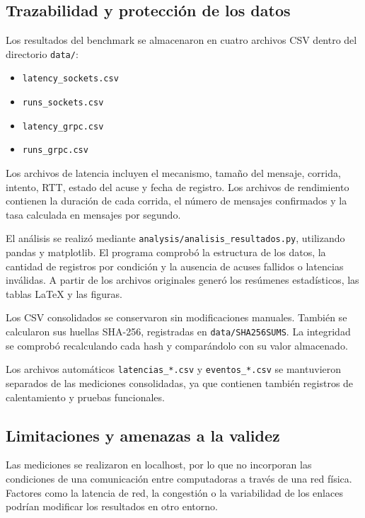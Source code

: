 \subsection{Trazabilidad y protección de los datos}

Los resultados del benchmark se almacenaron en cuatro archivos CSV
dentro del directorio \texttt{data/}:

\begin{itemize}
    \item \texttt{latency\_sockets.csv}
    \item \texttt{runs\_sockets.csv}
    \item \texttt{latency\_grpc.csv}
    \item \texttt{runs\_grpc.csv}
\end{itemize}

Los archivos de latencia incluyen el mecanismo, tamaño del mensaje, corrida, intento, RTT, estado del acuse y fecha de registro. Los archivos de rendimiento contienen la duración de cada corrida, el número de mensajes confirmados y la tasa calculada en mensajes por segundo.

El análisis se realizó mediante \texttt{analysis/analisis\_resultados.py}, utilizando pandas y matplotlib. El programa comprobó la estructura de los datos, la cantidad de registros por condición y la ausencia de acuses fallidos o latencias inválidas. A partir de los archivos originales generó los resúmenes estadísticos, las tablas LaTeX y las figuras.

Los CSV consolidados se conservaron sin modificaciones manuales. También se calcularon sus huellas SHA-256, registradas en \texttt{data/SHA256SUMS}. La integridad se comprobó recalculando cada hash y comparándolo con su valor almacenado.

Los archivos automáticos \texttt{latencias\_*.csv} y \texttt{eventos\_*.csv} se mantuvieron separados de las mediciones consolidadas, ya que contienen también registros de calentamiento y pruebas funcionales.

\subsection{Limitaciones y amenazas a la validez}

Las mediciones se realizaron en localhost, por lo que no incorporan las condiciones de una comunicación entre computadoras a través de una red física. Factores como la latencia de red, la congestión o la variabilidad de los enlaces podrían modificar los resultados en otro entorno.

